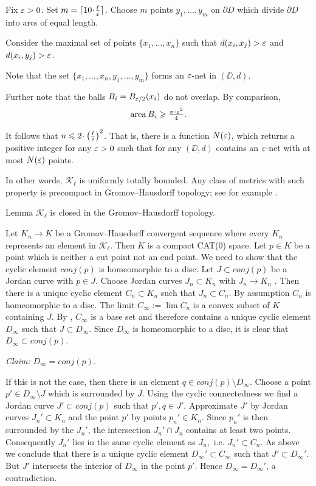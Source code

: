 \documentclass[a4paper,10pt]{amsart}
\begin{document}
Fix $\varepsilon>0$. 
Set $m=\lceil 10\cdot\tfrac\ell\eps\rceil$.
Choose $m$ points $y_1,\dots,y_m$ on $\partial D$
which divide $\partial D$ into arcs of equal length.

Consider the maximal set of points $\{x_1,\dots,x_n\}$ such that $d(x_i,x_j)>\varepsilon$ and $d(x_i,y_j)>\varepsilon$.

Note that the set $\{x_1,\dots,x_n,y_1,\dots,y_m\}$
forms an $\varepsilon$-net in $(\DD,d)$.

Further note that the balls $B_i=B_{\varepsilon/2}(x_i)$
do not overlap.
By comparison,
\[\area B_i\ge \tfrac{\pi\cdot\eps^2}{4}.\]

It follows that $n\le 2\cdot\left(\tfrac\ell\eps\right)^2$.
That is, there is a function $N(\varepsilon)$,
which returns a positive integer for any $\varepsilon>0$
such that for any 
$(\DD,d)$ contains an $\varepsilon$-net
with at most $N(\varepsilon)$ points.

In other words, $\mathcal{K}_\ell$ is uniformly totally bounded.
Any class of metrics with such property is precompact in Gromov--Hausdorff topology; 
see for example \cite[7.4.15]{BBI}.
\qeds





\begin{thm}{Lemma}
$\mathcal{K}_\ell$ is closed in the Gromov--Hausdorff topology.
\end{thm}
Let $K_n\to K$ be a Gromov--Hausdorff convergent sequence  where every $K_n$ represents an element in  $\mathcal{K}_\ell$. Then
$K$ is a compact CAT(0) space. Let $p\in K$ be a point which is neither a cut point not an end point. We need to show that the cyclic 
element $conj(p)$ is homeomorphic to a disc. Let $J\subset conj(p)$ be a Jordan curve with $p\in J$. Choose Jordan curves $J_n\subset K_n$
with $J_n\to K_n$ \cite[2.2]{W1}. Then there is a unique cyclic element $C_n\subset K_n$ such that $J_n\subset C_n$. By assumption $C_n$ is homeomorphic
to a disc. The limit $C_\infty:=\lim C_n$ is a convex subset of $K$ containing $J$. By \cite[6.3]{W1}, $C_\infty$ is a base set and therefore contains a
unique cyclic element $D_\infty$ such that $J\subset D_\infty$. Since $D_\infty$ is homeomorphic to a disc, it is clear that $D_\infty\subset conj(p)$.

{\it Claim:} $D_\infty=conj(p)$.

\noindent If this is not the case, then there is an element $q\in conj(p)\setminus D_\infty$. Choose a point $p'\in D_\infty\setminus J$ which is surrounded 
by $J$. Using the cyclic connectedness we find a Jordan curve $J'\subset conj(p)$ such that $p',q\in J'$. Approximate $J'$
by Jordan curves $J_n'\subset K_n$ and the point $p'$ by points $p_n'\in K_n$. Since $p_n'$ is then surrounded by the $J_n'$, the intersection
$J_n'\cap J_n$ contains at least two points. Consequently $J_n'$ lies in the same cyclic element as $J_n$,\ i.e. $J_n'\subset C_n$. As
above we conclude that there is a unique cyclic element $D_\infty'\subset C_\infty$ such that $J'\subset D_\infty'$. But 
$J'$ intersects the interior of $D_\infty$ in the point $p'$. Hence $D_\infty=D_\infty'$, a contradiction.
\qeds
\end{document}
